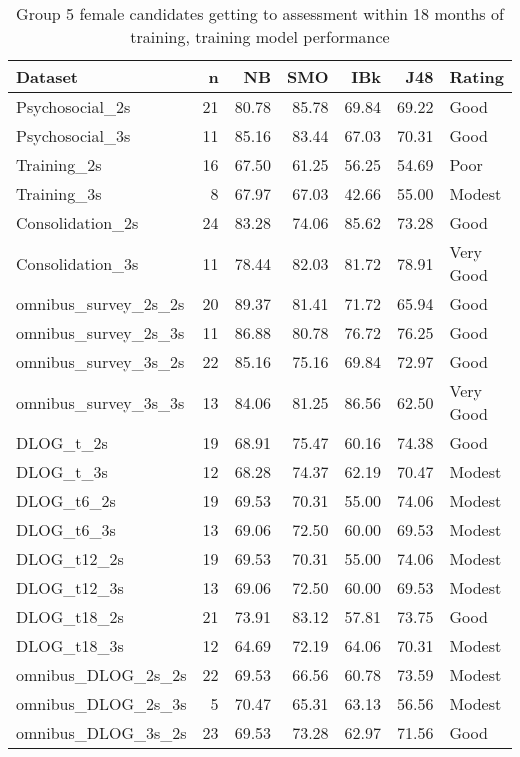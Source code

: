 \documentclass[a4paper,]{book}
\begin{document}
\begin{table}

\caption{\label{tab:g5-female-gta18m-train-models}Group 5 female candidates getting to assessment within 18 months of training, training model performance}
\centering
\begin{tabular}[t]{lrrrrrl}
\toprule
Dataset & n & NB & SMO & IBk & J48 & Rating\\
\midrule
Psychosocial\_2s & 21 & 80.78 & 85.78 & 69.84 & 69.22 & Good\\
Psychosocial\_3s & 11 & 85.16 & 83.44 & 67.03 & 70.31 & Good\\
Training\_2s & 16 & 67.50 & 61.25 & 56.25 & 54.69 & Poor\\
Training\_3s & 8 & 67.97 & 67.03 & 42.66 & 55.00 & Modest\\
Consolidation\_2s & 24 & 83.28 & 74.06 & 85.62 & 73.28 & Good\\
\addlinespace
Consolidation\_3s & 11 & 78.44 & 82.03 & 81.72 & 78.91 & Very Good\\
omnibus\_survey\_2s\_2s & 20 & 89.37 & 81.41 & 71.72 & 65.94 & Good\\
omnibus\_survey\_2s\_3s & 11 & 86.88 & 80.78 & 76.72 & 76.25 & Good\\
omnibus\_survey\_3s\_2s & 22 & 85.16 & 75.16 & 69.84 & 72.97 & Good\\
omnibus\_survey\_3s\_3s & 13 & 84.06 & 81.25 & 86.56 & 62.50 & Very Good\\
\addlinespace
DLOG\_t\_2s & 19 & 68.91 & 75.47 & 60.16 & 74.38 & Good\\
DLOG\_t\_3s & 12 & 68.28 & 74.37 & 62.19 & 70.47 & Modest\\
DLOG\_t6\_2s & 19 & 69.53 & 70.31 & 55.00 & 74.06 & Modest\\
DLOG\_t6\_3s & 13 & 69.06 & 72.50 & 60.00 & 69.53 & Modest\\
DLOG\_t12\_2s & 19 & 69.53 & 70.31 & 55.00 & 74.06 & Modest\\
\addlinespace
DLOG\_t12\_3s & 13 & 69.06 & 72.50 & 60.00 & 69.53 & Modest\\
DLOG\_t18\_2s & 21 & 73.91 & 83.12 & 57.81 & 73.75 & Good\\
DLOG\_t18\_3s & 12 & 64.69 & 72.19 & 64.06 & 70.31 & Modest\\
omnibus\_DLOG\_2s\_2s & 22 & 69.53 & 66.56 & 60.78 & 73.59 & Modest\\
omnibus\_DLOG\_2s\_3s & 5 & 70.47 & 65.31 & 63.13 & 56.56 & Modest\\
\addlinespace
omnibus\_DLOG\_3s\_2s & 23 & 69.53 & 73.28 & 62.97 & 71.56 & Good\\

\end{tabular}
\end{table}
\end{document}
